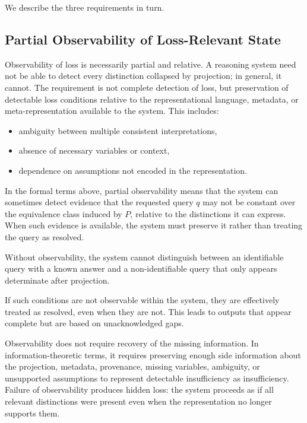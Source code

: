 \documentclass[11pt]{article}
\begin{document}
We describe the three requirements in turn.

\subsection{Partial Observability of Loss-Relevant State}

Observability of loss is necessarily partial and relative. A reasoning system need not be able to detect every distinction collapsed by projection; in general, it cannot. The requirement is not complete detection of loss, but preservation of detectable loss conditions relative to the representational language, metadata, or meta-representation available to the system. This includes:

\begin{itemize}[leftmargin=1.5em]
    \item ambiguity between multiple consistent interpretations,
    \item absence of necessary variables or context,
    \item dependence on assumptions not encoded in the representation.
\end{itemize}

In the formal terms above, partial observability means that the system can sometimes detect evidence that the requested query $q$ may not be constant over the equivalence class induced by $P$, relative to the distinctions it can express. When such evidence is available, the system must preserve it rather than treating the query as resolved.

Without observability, the system cannot distinguish between an identifiable query with a known answer and a non-identifiable query that only appears determinate after projection.

If such conditions are not observable within the system, they are effectively treated as resolved, even when they are not. This leads to outputs that appear complete but are based on unacknowledged gaps.

Observability does not require recovery of the missing information. In information-theoretic terms, it requires preserving enough side information about the projection, metadata, provenance, missing variables, ambiguity, or unsupported assumptions to represent detectable insufficiency as insufficiency. Failure of observability produces hidden loss: the system proceeds as if all relevant distinctions were present even when the representation no longer supports them.
\end{document}
